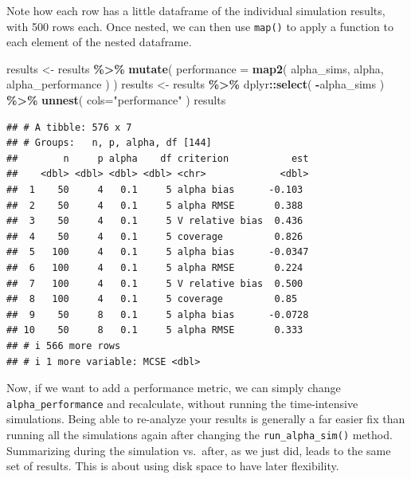 \documentclass[
]{book}
\newenvironment{Shaded}{\begin{snugshade}}{\end{snugshade}}
\newcommand{\AttributeTok}[1]{\textcolor[rgb]{0.13,0.29,0.53}{#1}}
\newcommand{\FunctionTok}[1]{\textcolor[rgb]{0.13,0.29,0.53}{\textbf{#1}}}
\newcommand{\NormalTok}[1]{#1}
\newcommand{\OtherTok}[1]{\textcolor[rgb]{0.56,0.35,0.01}{#1}}
\newcommand{\SpecialCharTok}[1]{\textcolor[rgb]{0.81,0.36,0.00}{\textbf{#1}}}
\newcommand{\StringTok}[1]{\textcolor[rgb]{0.31,0.60,0.02}{#1}}
\begin{document}
Note how each row has a little dataframe of the individual simulation results, with 500 rows each.
Once nested, we can then use \texttt{map()} to apply a function to each element of the nested dataframe.

\begin{Shaded}
\begin{Highlighting}[]
\NormalTok{results }\OtherTok{\textless{}{-}}\NormalTok{ results }\SpecialCharTok{\%\textgreater{}\%}
  \FunctionTok{mutate}\NormalTok{( }\AttributeTok{performance =} \FunctionTok{map2}\NormalTok{( alpha\_sims, alpha, }
\NormalTok{                              alpha\_performance ) )}
\NormalTok{results }\OtherTok{\textless{}{-}}\NormalTok{ results }\SpecialCharTok{\%\textgreater{}\%}
\NormalTok{  dplyr}\SpecialCharTok{::}\FunctionTok{select}\NormalTok{( }\SpecialCharTok{{-}}\NormalTok{alpha\_sims ) }\SpecialCharTok{\%\textgreater{}\%}
  \FunctionTok{unnest}\NormalTok{( }\AttributeTok{cols=}\StringTok{"performance"}\NormalTok{ ) }
\NormalTok{results}
\end{Highlighting}
\end{Shaded}

\begin{verbatim}
## # A tibble: 576 x 7
## # Groups:   n, p, alpha, df [144]
##        n     p alpha    df criterion           est
##    <dbl> <dbl> <dbl> <dbl> <chr>             <dbl>
##  1    50     4   0.1     5 alpha bias      -0.103 
##  2    50     4   0.1     5 alpha RMSE       0.388 
##  3    50     4   0.1     5 V relative bias  0.436 
##  4    50     4   0.1     5 coverage         0.826 
##  5   100     4   0.1     5 alpha bias      -0.0347
##  6   100     4   0.1     5 alpha RMSE       0.224 
##  7   100     4   0.1     5 V relative bias  0.500 
##  8   100     4   0.1     5 coverage         0.85  
##  9    50     8   0.1     5 alpha bias      -0.0728
## 10    50     8   0.1     5 alpha RMSE       0.333 
## # i 566 more rows
## # i 1 more variable: MCSE <dbl>
\end{verbatim}

Now, if we want to add a performance metric, we can simply change \texttt{alpha\_performance} and recalculate, without running the time-intensive simulations.
Being able to re-analyze your results is generally a far easier fix than running all the simulations again
after changing the \texttt{run\_alpha\_sim()} method.
Summarizing during the simulation vs.~after, as we just did, leads to the same set of results.
This is about using disk space to have later flexibility.
\end{document}
